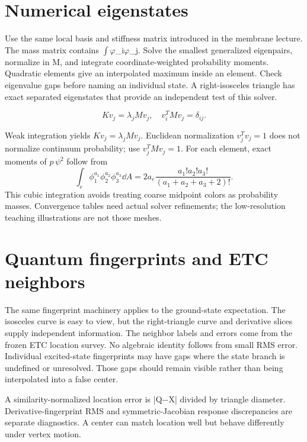 \documentclass[11pt,oneside,openany]{book}
\begin{document}
\section{Numerical eigenstates}\label{sec:slide53}

Use the same local basis and stiffness matrix introduced in the membrane lecture. The mass matrix contains \ensuremath{\int}\ensuremath{\varphi}\_i\ensuremath{\varphi}\_j. Solve the smallest generalized eigenpairs, normalize in M, and integrate coordinate-weighted probability moments. Quadratic elements give an interpolated maximum inside an element. Check eigenvalue gaps before naming an individual state. A right-isosceles triangle has exact separated eigenstates that provide an independent test of this solver.


\[Kv_j=\lambda_jMv_j,\quad v_i^TMv_j=\delta_{ij}.\]



Weak integration yields $Kv_j=\lambda_jMv_j$.
Euclidean normalization $v_j^Tv_j=1$ does not normalize continuum
probability; use $v_j^TMv_j=1$.
For each element, exact moments of $p\,\psi^2$ follow from
\[
\int_e\phi_1^{a_1}\phi_2^{a_2}\phi_3^{a_3}\dd A
=2a_e\frac{a_1!a_2!a_3!}{(a_1+a_2+a_3+2)!}.
\]
This cubic integration avoids treating coarse midpoint colors as
probability masses. Convergence tables need actual solver refinements;
the low-resolution teaching illustrations are not those meshes.




\section{Quantum fingerprints and ETC neighbors}\label{sec:slide54}

The same fingerprint machinery applies to the ground-state expectation. The isosceles curve is easy to view, but the right-triangle curve and derivative slices supply independent information. The neighbor labels and errors come from the frozen ETC location survey. No algebraic identity follows from small RMS error. Individual excited-state fingerprints may have gaps where the state branch is undefined or unresolved. Those gaps should remain visible rather than being interpolated into a false center.


A similarity-normalized location error is |Q\ensuremath{-}X| divided by triangle diameter. Derivative-fingerprint RMS and symmetric-Jacobian response discrepancies are separate diagnostics. A center can match location well but behave differently under vertex motion.
\end{document}
